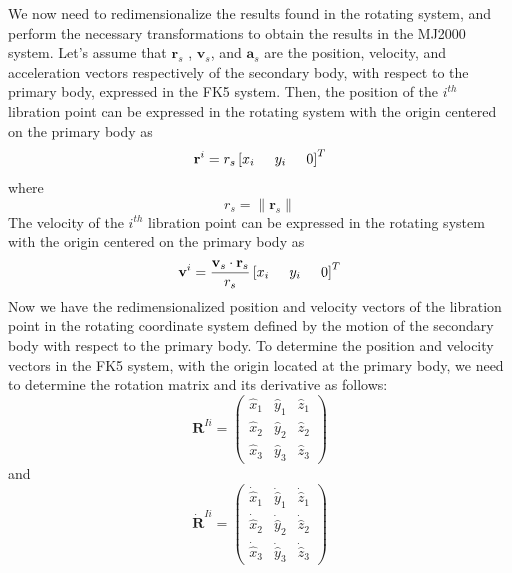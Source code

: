 We now need to redimensionalize the results found in the rotating
system, and perform the necessary transformations to obtain the
results in the MJ2000 system.  Let's assume that $\mathbf{r}_s$ ,
$\mathbf{v}_s$, and $\mathbf{a}_s$ are the position, velocity, and
acceleration vectors respectively of the secondary body, with
respect to the primary body, expressed in the FK5 system.  Then, the
position of the $i^{th}$ libration point can be expressed in the
rotating system with the origin centered on the primary body as
%
\begin{equation}
     \mathbf{r}^i = r_s\left[x_i \hspace{.2 in} y_i \hspace{.2 in} 0 \right]^T
\end{equation}
%
where
%
\begin{equation}
    r_s = \| \mathbf{r}_s\|
\end{equation}
%
The velocity of the $i^{th}$ libration point can be expressed in the
rotating system with the origin centered on the primary body as
%
\begin{equation}
     \mathbf{v}^i = \frac{\mathbf{v}_s\cdot\mathbf{r}_s}{r_s}\left[x_i \hspace{.2 in} y_i \hspace{.2 in} 0 \right]^T
\end{equation}
%
Now we have the redimensionalized position and velocity vectors of
the libration point in the rotating coordinate system defined by the
motion of the secondary body with respect to the primary body. To
determine the position and velocity vectors in the FK5 system, with
the origin located at the primary body, we need to determine the
rotation matrix and its derivative as follows:
%
\begin{equation}
         \mathbf{R}^{Ii} = \begin{pmatrix}
               \hat{x}_1 & \hat{y}_1  & \hat{z}_1  \\
               \hat{x}_2 & \hat{y}_2  & \hat{z}_2  \\
               \hat{x}_3 & \hat{y}_3  & \hat{z}_3
               \label{Eq:RObjectReferenced}
     \end{pmatrix}
\end{equation}
and
\begin{equation}
         \dot{\mathbf{R}}^{Ii} = \begin{pmatrix}
               \dot{\hat{x}}_1 & \dot{\hat{y}}_1  & \dot{\hat{z}}_1  \\
               \dot{\hat{x}}_2 & \dot{\hat{y}}_2  & \dot{\hat{z}}_2  \\
               \dot{\hat{x}}_3 & \dot{\hat{y}}_3  & \dot{\hat{z}}_3
               \label{Eq:RdotObjectReferenced}
     \end{pmatrix}
\end{equation}
